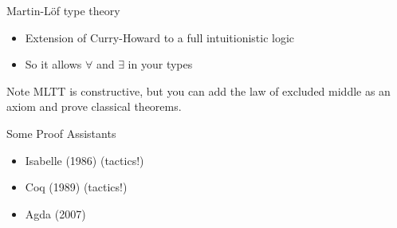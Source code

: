 \documentclass{beamer}
\begin{document}
\begin{frame}{Martin-L\"{o}f type theory}
  \begin{itemize}
    \item Extension of Curry-Howard to a full intuitionistic logic
    \item So it allows $\forall$ and $\exists$ in your types
  \end{itemize}
  \pause
  \begin{alertblock}{Note}
  MLTT is constructive, but you can add
  the law of excluded middle as an axiom and prove classical theorems.
  \end{alertblock}
\end{frame}

\begin{frame}{Some Proof Assistants}
  \begin{itemize}
    \item Isabelle (1986) (tactics!)
    \item Coq (1989) (tactics!)
    \item Agda (2007)
  \end{itemize}
\end{frame}
\end{document}
